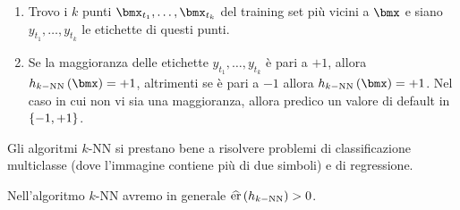 \documentclass[\main/main.tex]{subfiles}
\begin{document}
\begin{multicols}{2}
\begin{definition}[Algoritmi \(k\)-NN]
        \begin{enumerate}
            \item Trovo i \(k\) punti \(\bmx_{t_1}, \ldots, \bmx_{t_k}\) del training set più vicini a \(\bmx\) e siano \(y_{t_1}, \ldots, y_{t_k}\) le etichette di questi punti.
            \item Se la maggioranza delle etichette \(y_{t_1}, \ldots, y_{t_k}\) è pari a \(+1\), allora \(\hkNN{\bmx} = +1\), altrimenti se è pari a \(-1\) allora \(\hkNN{\bmx} = +1\). Nel caso in cui non vi sia una maggioranza, allora predico un valore di default in \(\left\{-1, +1\right\}\).
        \end{enumerate}
    \end{definition}
    \begin{observation}
        Gli algoritmi \(k\)-NN si prestano bene a risolvere problemi di classificazione multiclasse (dove l'immagine contiene più di due simboli) e di regressione.
    \end{observation}
    \begin{observation}
        Nell'algoritmo \(k\)-NN avremo in generale \(\widehat{\text{er}}\left(h_{k-\text{NN}}\right)>0\).
    \end{observation}
\end{multicols}
\end{document}
